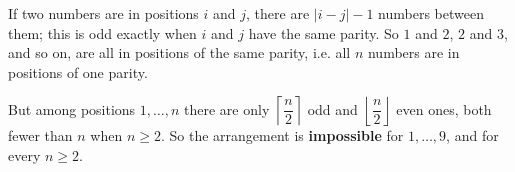 If two numbers are in positions $i$ and $j$, there are $|i-j|-1$ numbers between them; this is odd exactly when $i$ and $j$ have the same parity. So $1$ and $2$, $2$ and $3$, and so on, are all in positions of the same parity, i.e. all $n$ numbers are in positions of one parity.

But among positions $1,\dots,n$ there are only $\left\lceil\dfrac n2\right\rceil$ odd and $\left\lfloor\dfrac n2\right\rfloor$ even ones, both fewer than $n$ when $n\ge2$. So the arrangement is \textbf{impossible} for $1,\dots,9$, and for every $n\ge2$.

